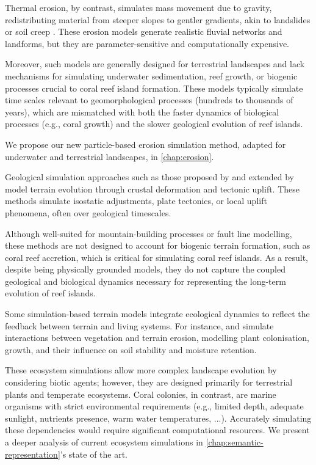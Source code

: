 Thermal erosion, by contrast, simulates mass movement due to gravity, redistributing material from steeper slopes to gentler gradients, akin to landslides or soil creep \cite{Benes2006}. These erosion models generate realistic fluvial networks and landforms, but they are parameter-sensitive and computationally expensive.

Moreover, such models are generally designed for terrestrial landscapes and lack mechanisms for simulating underwater sedimentation, reef growth, or biogenic processes crucial to coral reef island formation. These models typically simulate time scales relevant to geomorphological processes (hundreds to thousands of years), which are mismatched with both the faster dynamics of biological processes (e.g., coral growth) and the slower geological evolution of reef islands.

We propose our new particle-based erosion simulation method, adapted for underwater and terrestrial landscapes, in \cref{chap:erosion}.


Geological simulation approaches such as those proposed by \cite{Cordonnier2016, Cordonnier2017a} and extended by \cite{Schott2023} model terrain evolution through crustal deformation and tectonic uplift. These methods simulate isostatic adjustments, plate tectonics, or local uplift phenomena, often over geological timescales.

Although well-suited for mountain-building processes or fault line modelling, these methods are not designed to account for biogenic terrain formation, such as coral reef accretion, which is critical for simulating coral reef islands. As a result, despite being physically grounded models, they do not capture the coupled geological and biological dynamics necessary for representing the long-term evolution of reef islands.


Some simulation-based terrain models integrate ecological dynamics to reflect the feedback between terrain and living systems. For instance, \cite{Ecormier-Nocca2021} and \cite{Cordonnier2017b} simulate interactions between vegetation and terrain erosion, modelling plant colonisation, growth, and their influence on soil stability and moisture retention.

These ecosystem simulations allow more complex landscape evolution by considering biotic agents; however, they are designed primarily for terrestrial plants and temperate ecosystems. Coral colonies, in contrast, are marine organisms with strict environmental requirements (e.g., limited depth, adequate sunlight, nutrients presence, warm water temperatures, ...). Accurately simulating these dependencies would require significant computational resources. We present a deeper analysis of current ecosystem simulations in \cref{chap:semantic-representation}'s state of the art.

